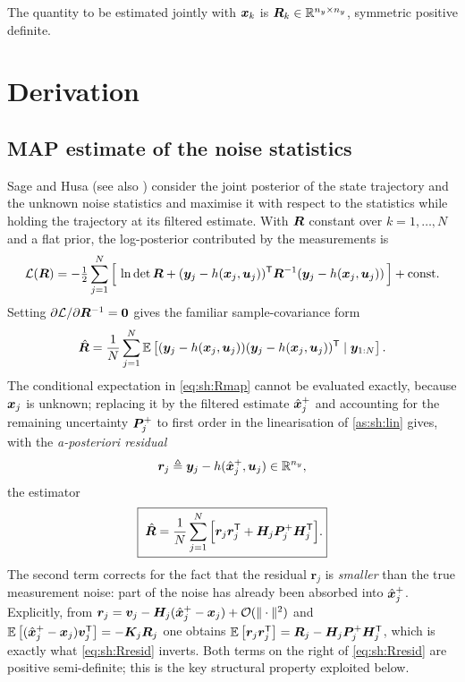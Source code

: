 The quantity to be estimated jointly with $\bm{x}_k$ is $\bm{R}_k\in\mathbb{R}^{n_y\times n_y}$, symmetric
positive definite.

\section{Derivation}

\subsection{MAP estimate of the noise statistics}
Sage and Husa \cite{sagehusa1969} (see also \cite[Ch.~9]{sagemelsa1971}) consider the joint
posterior of the state trajectory and the unknown noise statistics and maximise it with respect to
the statistics while holding the trajectory at its filtered estimate.  With $\bm{R}$ constant over
$k=1,\dots,N$ and a flat prior, the log-posterior contributed by the measurements is
\begin{equation}
\mathcal{L}(\bm{R}) = -\tfrac{1}{2}\sum_{j=1}^{N}\Big[\,\ln\det\bm{R} + (\bm{y}_j-h(\bm{x}_j,\bm{u}_j))^{\mathsf{T}} \bm{R}^{-1} (\bm{y}_j-h(\bm{x}_j,\bm{u}_j))\,\Big] + \text{const}.
\label{eq:sh:loglik}
\end{equation}
Setting $\partial\mathcal{L}/\partial \bm{R}^{-1} = \bm{0}$ gives the familiar sample-covariance form
\begin{equation}
\hat{\bm{R}} = \frac{1}{N}\sum_{j=1}^{N} \mathbb{E}\left[(\bm{y}_j-h(\bm{x}_j,\bm{u}_j))(\bm{y}_j-h(\bm{x}_j,\bm{u}_j))^{\mathsf{T}} \mid \bm{y}_{1:N}\right].
\label{eq:sh:Rmap}
\end{equation}
The conditional expectation in \eqref{eq:sh:Rmap} cannot be evaluated exactly, because $\bm{x}_j$ is
unknown; replacing it by the filtered estimate $\hat{\bm{x}}^{+}_j$ and accounting for the remaining
uncertainty $\bm{P}^{+}_j$ to first order in the linearisation of \cref{as:sh:lin} gives, with the
\emph{a-posteriori residual}
\begin{equation}
\bm{r}_j \triangleq \bm{y}_j - h(\hat{\bm{x}}^{+}_j,\bm{u}_j) \in\mathbb{R}^{n_y},
\label{eq:sh:resid}
\end{equation}
the estimator
\begin{equation}
\boxed{\;\hat{\bm{R}} = \frac{1}{N}\sum_{j=1}^{N}\Big[\bm{r}_j\bm{r}_j^{\mathsf{T}} + \bm{H}_j\bm{P}^{+}_j\bm{H}_j^{\mathsf{T}}\Big].}
\label{eq:sh:Rresid}
\end{equation}
The second term corrects for the fact that the residual $\bm{r}_j$ is \emph{smaller} than the true
measurement noise: part of the noise has already been absorbed into $\hat{\bm{x}}^{+}_j$.  Explicitly, from
$\bm{r}_j=\bm{v}_j-\bm{H}_j(\hat{\bm{x}}^{+}_j-\bm{x}_j)+\mathcal{O}(\|\cdot\|^2)$ and
$\mathbb{E}\left[(\hat{\bm{x}}^{+}_j-\bm{x}_j)\bm{v}_j^{\mathsf{T}}\right] = -\bm{K}_j\bm{R}_j$ one obtains
$\mathbb{E}\left[\bm{r}_j\bm{r}_j^{\mathsf{T}}\right] = \bm{R}_j - \bm{H}_j\bm{P}^{+}_j\bm{H}_j^{\mathsf{T}}$, which is exactly what \eqref{eq:sh:Rresid}
inverts.  Both terms on the right of \eqref{eq:sh:Rresid} are positive semi-definite; this is the
key structural property exploited below.

